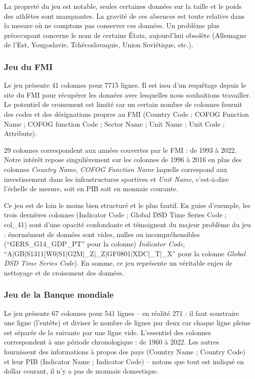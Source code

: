 \documentclass[hidelinks, 12pt]{article}
\begin{document}
La propreté du jeu est notable, seules certaines données sur la taille et le poids des athlètes sont manquantes. La gravité de ces absences est toute relative dans la mesure où ne comptons pas conserver ces données. Un problème plus préoccupant concerne le nom de certains États, aujourd'hui obsolète (Allemagne de l'Est, Yougoslavie, Tchécoslovaquie, Union Soviétique, etc.).





\subsubsection{Jeu du FMI}

Le jeu présente 41 colonnes pour 7715 lignes. Il est issu d'un requêtage depuis le site du FMI pour récupérer les données avec lesquelles nous souhaitions travailler. Le potentiel de croisement est limité car un certain nombre de colonnes fournit des codes et des désignations propres au FMI (Country Code ; COFOG Function Name ; COFOG function Code ; Sector Name ; Unit Name ; Unit Code ; Attribute).

29 colonnes correspondent aux années couvertes par le FMI : de 1993 à 2022. Notre intérêt repose singulièrement sur les colonnes de 1996 à 2016 en plus des colonnes \emph{Country Name}, \emph{COFOG Function Name} laquelle correspond aux investissement dans les infrastructures sportives et \emph{Unit Name}, c'est-à-dire l'échelle de mesure, soit en PIB soit en monnaie courante.

Ce jeu est de loin le moins bien structuré et le plus fautif. En guise d'exemple, les trois dernières colonnes (Indicator Code ; Global DSD Time Series Code ; col\_41) sont d'une opacité confondante et témoignent du majeur problème du jeu : énormément de données sont vides, nulles ou incompréhensibles (\enquote{GERS\_G14\_GDP\_PT} pour la colonne) \emph{Indicator Code}, \enquote{A|GB|S1311|W0|S1|G2M|\_Z|\_Z|GF0801|XDC|\_T|\_X} pour la colonne \emph{Global DSD Time Series Code}). En somme, ce jeu représente un véritable enjeu de nettoyage et de croisement des données.





\subsubsection{Jeu de la Banque mondiale}

Le jeu présente 67 colonnes pour 541 lignes -- en réalité 271 : il faut soustraire une ligne (l'entête) et diviser le nombre de lignes par deux car chaque ligne pleine est séparée de la suivante par une ligne vide. L'essentiel des colonnes correspondent à une période chronologique : de 1960 à 2022. Les autres fournissent des informations à propos des pays (Country Name ; Country Code) et leur PIB (Indicator Name ; Indicator Code) -- notons que tout est indiqué en dollar courant, il n'y a pas de monnaie domestique.
\end{document}
